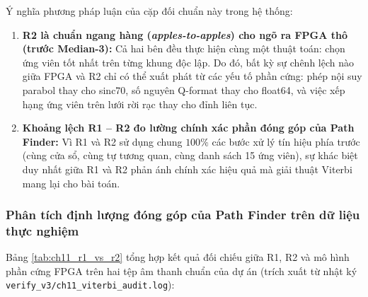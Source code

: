 Ý nghĩa phương pháp luận của cặp đối chuẩn này trong hệ thống:
\begin{enumerate}
    \item \textbf{R2 là chuẩn ngang hàng (\emph{apples-to-apples}) cho ngõ ra FPGA thô (trước Median-3):}
    Cả hai bên đều thực hiện cùng một thuật toán: chọn ứng viên tốt nhất trên từng khung độc lập. Do đó, bất kỳ sự chênh lệch nào giữa FPGA và R2 chỉ có thể xuất phát từ các yếu tố phần cứng: phép nội suy parabol thay cho sinc70, số nguyên Q-format thay cho float64, và việc xếp hạng ứng viên trên lưới rời rạc thay cho đỉnh liên tục.
    \item \textbf{Khoảng lệch R1 -- R2 đo lường chính xác phần đóng góp của Path Finder:}
    Vì R1 và R2 sử dụng chung $100\%$ các bước xử lý tín hiệu phía trước (cùng cửa sổ, cùng tự tương quan, cùng danh sách 15 ứng viên), sự khác biệt duy nhất giữa R1 và R2 phản ánh chính xác hiệu quả mà giải thuật Viterbi mang lại cho bài toán.
\end{enumerate}

\subsubsection*{Phân tích định lượng đóng góp của Path Finder trên dữ liệu thực nghiệm}
Bảng \ref{tab:ch11_r1_vs_r2} tổng hợp kết quả đối chiếu giữa R1, R2 và mô hình phần cứng FPGA trên hai tệp âm thanh chuẩn của dự án (trích xuất từ nhật ký \texttt{verify\_v3/ch11\_viterbi\_audit.log}):

